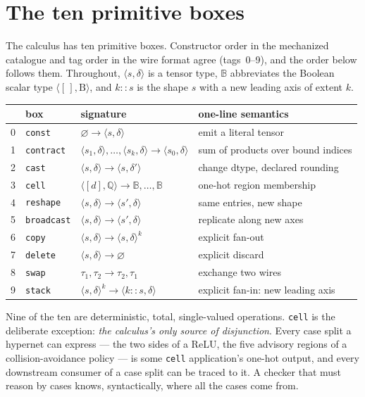 \section{The ten primitive boxes}
\label{sec:hyp-boxes}

The calculus has ten primitive boxes. Constructor order in the
mechanized catalogue and tag order in the wire format agree
(tags~0--9), and the order below follows them. Throughout,
$\langle s, \delta \rangle$ is a tensor type, $\mathbb{B}$
abbreviates the Boolean scalar type $\langle [\,], \mathrm{B}
\rangle$, and $k{::}s$ is the shape $s$ with a new leading axis of
extent $k$.

\begin{center}
\begin{tabular}{@{}llll@{}}
\toprule
 & box & signature & one-line semantics \\
\midrule
0 & \texttt{const} & $\varnothing \to \langle s,\delta\rangle$ & emit a literal tensor \\
1 & \texttt{contract} & $\langle s_1,\delta\rangle,\dots,\langle s_k,\delta\rangle \to \langle s_0,\delta\rangle$ & sum of products over bound indices \\
2 & \texttt{cast} & $\langle s,\delta\rangle \to \langle s,\delta'\rangle$ & change dtype, declared rounding \\
3 & \texttt{cell} & $\langle [d],\mathbb{Q}\rangle \to \mathbb{B},\dots,\mathbb{B}$ & one-hot region membership \\
4 & \texttt{reshape} & $\langle s,\delta\rangle \to \langle s',\delta\rangle$ & same entries, new shape \\
5 & \texttt{broadcast} & $\langle s,\delta\rangle \to \langle s',\delta\rangle$ & replicate along new axes \\
6 & \texttt{copy} & $\langle s,\delta\rangle \to \langle s,\delta\rangle^{k}$ & explicit fan-out \\
7 & \texttt{delete} & $\langle s,\delta\rangle \to \varnothing$ & explicit discard \\
8 & \texttt{swap} & $\tau_1, \tau_2 \to \tau_2, \tau_1$ & exchange two wires \\
9 & \texttt{stack} & $\langle s,\delta\rangle^{k} \to \langle k{::}s,\delta\rangle$ & explicit fan-in: new leading axis \\
\bottomrule
\end{tabular}
\end{center}

Nine of the ten are deterministic, total, single-valued operations.
\texttt{cell} is the deliberate exception: \emph{the calculus's only
source of disjunction}.
Every case split a hypernet can express --- the two sides of a ReLU,
the five advisory regions of a collision-avoidance policy --- is some
\texttt{cell} application's one-hot output, and every downstream
consumer of a case split can be traced to it. A checker that must
reason by cases knows, syntactically, where all the cases come from.

